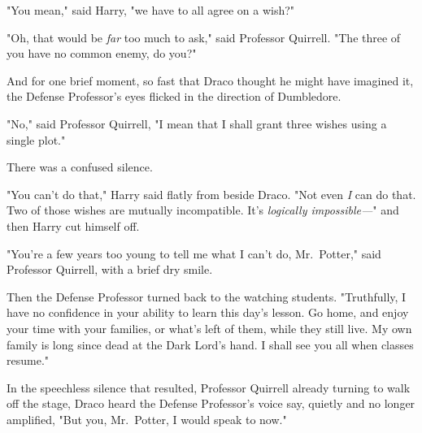 "You mean," said Harry, "we have to all agree on a wish?"

"Oh, that would be \emph{far} too much to ask," said Professor Quirrell. "The
three of you have no common enemy, do you?"

And for one brief moment, so fast that Draco thought he might have imagined it,
the Defense Professor's eyes flicked in the direction of Dumbledore.

"No," said Professor Quirrell, "I mean that I shall grant three wishes using a
single plot."

There was a confused silence.

"You can't do that," Harry said flatly from beside Draco. "Not even \emph{I}
can do that. Two of those wishes are mutually incompatible. It's
\emph{logically impossible---}" and then Harry cut himself off.

"You're a few years too young to tell me what I can't do, Mr.~Potter," said
Professor Quirrell, with a brief dry smile.

Then the Defense Professor turned back to the watching students. "Truthfully, I
have no confidence in your ability to learn this day's lesson. Go home, and
enjoy your time with your families, or what's left of them, while they still
live. My own family is long since dead at the Dark Lord's hand. I shall see you
all when classes resume."

In the speechless silence that resulted, Professor Quirrell already turning to
walk off the stage, Draco heard the Defense Professor's voice say, quietly and
no longer amplified, "But you, Mr.~Potter, I would speak to now."
